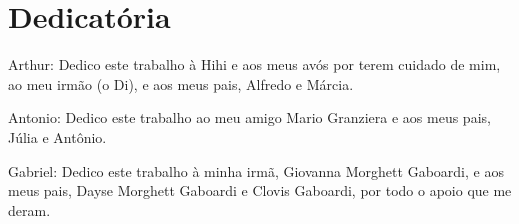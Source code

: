 \chapter*{Dedicatória}

\noindent 
Arthur:
Dedico este trabalho à Hihi e aos meus avós por terem cuidado de mim, ao meu irmão (o Di), e aos meus pais, Alfredo e Márcia.

\noindent 
Antonio:
Dedico este trabalho ao meu amigo Mario Granziera e aos meus pais, Júlia e Antônio.

\noindent 
Gabriel:
Dedico este trabalho à minha irmã, Giovanna Morghett Gaboardi, e aos meus pais, Dayse Morghett Gaboardi e Clovis Gaboardi, por todo o apoio que me deram.